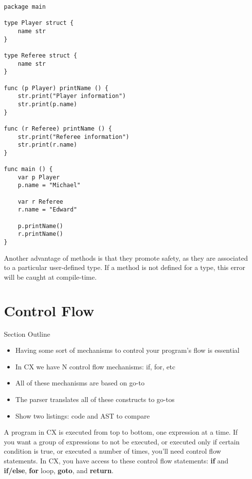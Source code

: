 \documentclass[11pt,fleqn,openany]{book} %
\begin{document}
\begin{lstlisting}[caption={Methods Example},captionpos=b,label={listing:methods-example}]
package main

type Player struct {
	name str
}

type Referee struct {
	name str
}

func (p Player) printName () {
	str.print("Player information")
	str.print(p.name)
}

func (r Referee) printName () {
	str.print("Referee information")
	str.print(r.name)
}

func main () {
	var p Player
	p.name = "Michael"
    
    var r Referee
    r.name = "Edward"

	p.printName()
    r.printName()
}
\end{lstlisting}

Another advantage of methods is that they promote safety, as they are associated to a particular user-defined type. If a method is not defined for a type, this error will be caught at compile-time.



\chapter{Control Flow}
\label{chapter:control-flow}

\begin{remark}
Section Outline
    \begin{itemize}
    	\item Having some sort of mechanisms to control your program's flow is essential
        \item In CX we have N control flow mechanisms: if, for, etc
        \item All of these mechanisms are based on go-to
        \item The parser translates all of these constructs to go-tos
        \item Show two listings: code and AST to compare
    \end{itemize}
\end{remark}

A program in CX is executed from top to bottom, one expression at a time. If you want a group of expressions to not be executed, or executed only if certain condition is true, or executed a number of times, you'll need control flow statements. In CX, you have access to these control flow statements: \textbf{if} and \textbf{if/else}, \textbf{for} loop, \textbf{goto}, and \textbf{return}.
\end{document}
